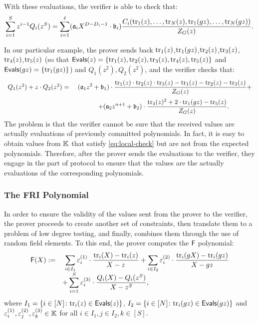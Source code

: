 With these evaluations, the verifier is able to check that:
\begin{align}\label{eq:local-check}
\sum_{i=1}^S z^{i-1} Q_i(z^S) = \sum_{i=1}^\ell (\mathfrak{a}_iX^{D-D_i-1} \cdot  \mathfrak{b}_i)\frac{C_i(\text{tr}_1(z), \dots, \text{tr}_N(z), \text{tr}_1(gz), \dots, \text{tr}_N(gz))}{Z_G(z)}.
\end{align}

In our particular example, the prover sends back $\text{tr}_1(z)$,$\text{tr}_1(gz)$,$\text{tr}_2(z)$,$\text{tr}_3(z)$,$\text{tr}_4(z)$,$\text{tr}_5(z)$ (so that $\textsf{Evals}(z) = \{\text{tr}_1(z),\text{tr}_2(z),\text{tr}_3(z),\text{tr}_4(z),\text{tr}_5(z)\}$ and $\textsf{Evals}(gz) = \{\text{tr}_1(gz)\}$) and $Q_1(z^2),Q_2(z^2)$, and the verifier checks that:
\begin{align}
\begin{array}{cc}
Q_1(z^2) + z \cdot Q_2(z^2) = &~ \displaystyle (\mathfrak{a}_1 z^2 + \mathfrak{b}_1) \cdot \frac{\text{tr}_1(z) \cdot \text{tr}_2(z) \cdot \text{tr}_3(z) - \text{tr}_1(z) - \text{tr}_2(z) - \text{tr}_3(z)}{Z_G(z)} + \\[0.4cm]
&+ \displaystyle (\mathfrak{a}_2 z^{n+1} + \mathfrak{b}_2) \cdot \frac{\text{tr}_4(z)^2 + 2\cdot \text{tr}_1(gz) - \text{tr}_5(z)}{Z_G(z)}. 
\end{array}
\end{align}
The problem is that the verifier cannot be sure that the received values are actually evaluations of previously committed polynomials. In fact, it is easy to obtain values from $\mathbb{K}$ that satisfy \eqref{eq:local-check} but are not from the expected polynomials. Therefore, after the prover sends the evaluations to the verifier, they engage in the part of protocol to ensure that the values are the actually evaluations of the corresponding polynomials.  




\subsubsection*{The FRI Polynomial}

In order to ensure the validity of the values sent from the prover to the verifier, the prover proceeds to create another set of constraints, then translate them to a problem of low degree testing, and finally, combines them through the use of random field elements. To this end, the prover computes the $\textsf{F}$ polynomial:
\begin{align}\label{eq:FRI}
\begin{array}{rl}
\textsf{F}(X) := &\displaystyle~\sum_{i \in I_1} \varepsilon^{(1)}_i \cdot \frac{\text{tr}_i(X) - \text{tr}_i(z)}{X - z} + \sum_{i \in I_2} \varepsilon^{(2)}_i \cdot \frac{\text{tr}_i(gX) - \text{tr}_i(gz)}{X - gz} \\[0.2cm]
	&\displaystyle + \sum_{i=1}^S \varepsilon^{(3)}_i \cdot \frac{Q_i(X) - Q_i(z^S)}{X - z^S},
\end{array}
\end{align}
where $I_1 = \{i \in [N] \colon \text{tr}_i(z) \in \textsf{Evals}(z)\}$, $I_2 = \{i \in [N] \colon \text{tr}_i(gz) \in \textsf{Evals}(gz)\}$ and $\varepsilon^{(1)}_i,\varepsilon^{(2)}_j,\varepsilon^{(3)}_k \in \mathbb{K}$ for all $i \in I_1,j\in I_2, k\in[S]$.

